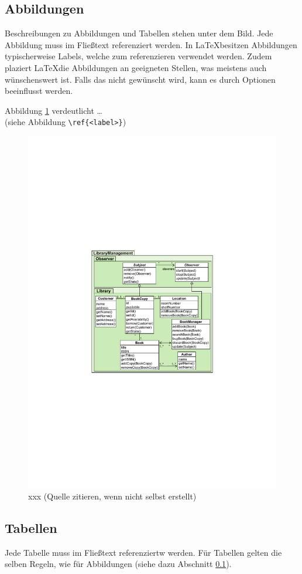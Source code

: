 \subsection{Abbildungen}
\label{sec:abbildungen}

Beschreibungen zu Abbildungen und Tabellen stehen unter dem Bild. Jede Abbildung muss im Fließtext referenziert werden. In \LaTeX besitzen Abbildungen typischerweise Labels, welche zum referenzieren verwendet werden. Zudem plaziert \LaTeX die Abbildungen an geeigneten Stellen, was meistens auch wünschenswert ist. Falls das nicht gewünscht wird, kann es durch Optionen beeinflusst werden.

Abbildung \ref{fig:xxx} verdeutlicht  \dots\\
(siehe Abbildung \verb|\ref{<label>}|)

\begin{figure}
	\centering
	\includegraphics[width=0.4\linewidth]{figures/figure1}
	\caption{xxx (Quelle zitieren, wenn nicht selbst erstellt)}
	\label{fig:xxx}
\end{figure}

\subsection{Tabellen}

Jede Tabelle muss im Fließtext referenziertw werden. Für Tabellen gelten die selben Regeln, wie für Abbildungen (siehe dazu Abschnitt \ref{sec:abbildungen}).

